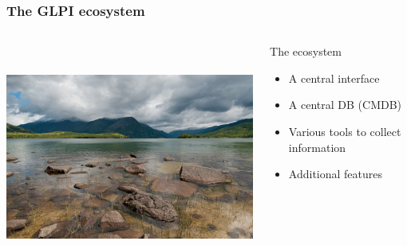 \documentclass{beamer}
\begin{document}
\begin{frame}

    \frametitle{The GLPI ecosystem}

 \begin{columns}
 \begin{column}{0.45\textwidth}
         \includegraphics[height=7.5cm]{./pics/ecosystem.jpg}
 \end{column}
 \begin{column}{0.65\textwidth}
    \begin{block}{The ecosystem}
        \begin{itemize}
            \item A central interface 
            \item A central DB (CMDB)
            \item Various tools to collect information 
            \item Additional features
        \end{itemize}
    \end{block}

 \end{column}
\end{columns}

\end{frame}
\end{document}
